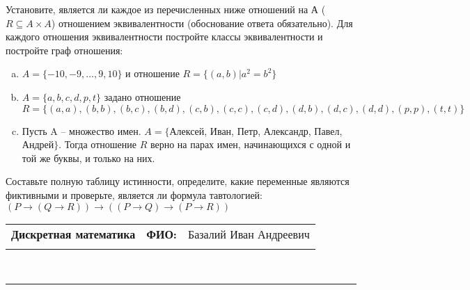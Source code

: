 \documentclass[10pt]{exam}
\newcommand{\class}{Дискретная математика}
\newcommand{\examdate}{}
\begin{document}
\begin{questions}
\question
Установите, является ли каждое из перечисленных ниже отношений на А ($R \subseteq A \times A$) отношением эквивалентности (обоснование ответа обязательно). Для каждого отношения эквивалентности постройте классы 
эквивалентности и постройте граф отношения:
\begin{enumerate} [a)]\setcounter{enumi}{0}
\item $A = \{-10, -9, … , 9, 10\}$ и отношение $R = \{(a,b)|a^{2} = b^{2}\}$
\item $A = \{a, b, c, d, p, t\}$ задано отношение $R = \{(a, a), (b, b), (b, c), (b, d), (c, b), (c, c), (c, d), (d, b), (d, c), (d, d), (p,p), (t,t)\}$
\item Пусть A – множество имен. $A = \{ $Алексей, Иван, Петр, Александр, Павел, Андрей$ \}$. Тогда отношение $R$ верно на парах имен, начинающихся с одной и той же буквы, и только на них.
\end{enumerate}\question Составьте полную таблицу истинности, определите, какие переменные являются фиктивными и проверьте, является ли формула тавтологией:
$(P \rightarrow (Q \rightarrow R)) \rightarrow ((P \rightarrow Q) \rightarrow (P \rightarrow R))$

\end{questions}
\newpage
\begin{flushright}
\begin{tabular}{p{2.8in} r l}
\textbf{\class} & \textbf{ФИО:} &Базалий Иван Андреевич
\\

\textbf{\examdate} &&\\
\end{tabular}\\
\end{flushright}
\rule[1ex]{\textwidth}{.1pt}
\end{document}
